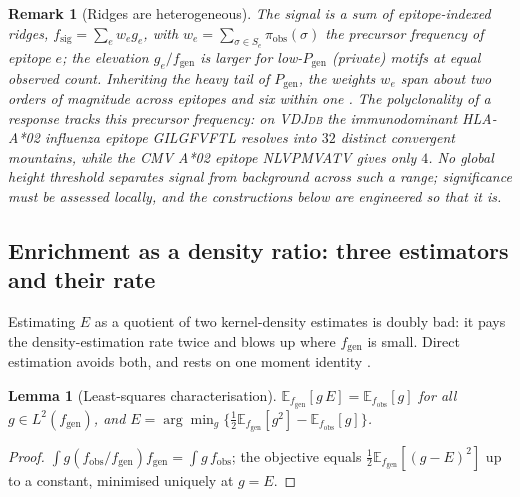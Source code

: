 \documentclass[11pt]{article}
\theoremstyle{oldplain}
\newtheorem{lemma}{Lemma}
\theoremstyle{oldrem}
\newtheorem{remark}{Remark}
\newcommand{\Pgen}{P_{\mathrm{gen}}}
\newcommand{\E}{\mathds{E}}
\begin{document}
\begin{remark}[Ridges are heterogeneous]\label{rem:ridges}
The signal is a sum of epitope-indexed ridges, $f_{\mathrm{sig}}=\sum_e w_e g_e$, with $w_e=\sum_{\sigma\in
S_e}\pi_{\mathrm{obs}}(\sigma)$ the precursor frequency of epitope $e$; the elevation $g_e/f_{\mathrm{gen}}$ is
\emph{larger} for low-$\Pgen$ (private) motifs at equal observed count. Inheriting the heavy tail of $\Pgen$,
the weights $w_e$ span about two orders of magnitude across epitopes and six within one
\cite{Pogorelyy2018}. The polyclonality of a response tracks this precursor frequency: on {\scshape VDJdb}
the immunodominant HLA-A*02 influenza epitope {\scshape GILGFVFTL} resolves into $32$ distinct convergent
mountains, while the {\scshape CMV} A*02 epitope {\scshape NLVPMVATV} gives only $4$. No global height
threshold separates signal from background across such a range; significance must be assessed locally, and
the constructions below are engineered so that it is.
\end{remark}

\subsection{Enrichment as a density ratio: three estimators and their rate}\label{sec:dens-dre}

Estimating $E$ as a quotient of two kernel-density estimates is doubly bad: it pays the density-estimation
rate twice and blows up where $f_{\mathrm{gen}}$ is small. Direct estimation avoids both, and rests on one
moment identity \cite{Kanamori2009,Sugiyama2012}.

\begin{lemma}[Least-squares characterisation]\label{lem:lsif}
$\E_{f_{\mathrm{gen}}}[g\,E]=\E_{f_{\mathrm{obs}}}[g]$ for all $g\in L^2(f_{\mathrm{gen}})$, and
$E=\arg\min_g\big\{\tfrac12\E_{f_{\mathrm{gen}}}[g^2]-\E_{f_{\mathrm{obs}}}[g]\big\}$.
\end{lemma}
\begin{proof}
$\int g(f_{\mathrm{obs}}/f_{\mathrm{gen}})f_{\mathrm{gen}}=\int g\,f_{\mathrm{obs}}$; the objective equals
$\tfrac12\E_{f_{\mathrm{gen}}}[(g-E)^2]$ up to a constant, minimised uniquely at $g=E$.
\end{proof}
\end{document}
